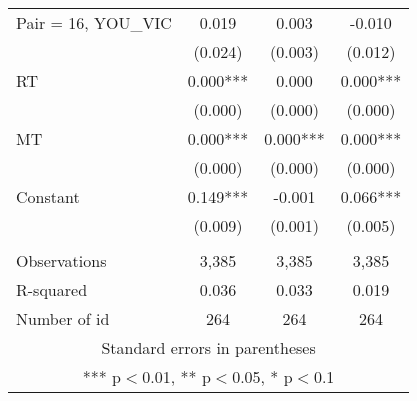 \documentclass[]{article}
\begin{document}
\begin{tabular}{lccc}
Pair = 16, YOU\_VIC & 0.019 & 0.003 & -0.010 \\
 & (0.024) & (0.003) & (0.012) \\
RT & 0.000*** & 0.000 & 0.000*** \\
 & (0.000) & (0.000) & (0.000) \\
MT & 0.000*** & 0.000*** & 0.000*** \\
 & (0.000) & (0.000) & (0.000) \\
Constant & 0.149*** & -0.001 & 0.066*** \\
 & (0.009) & (0.001) & (0.005) \\
 &  &  &  \\
Observations & 3,385 & 3,385 & 3,385 \\
R-squared & 0.036 & 0.033 & 0.019 \\
 Number of id & 264 & 264 & 264 \\ \hline
\multicolumn{4}{c}{ Standard errors in parentheses} \\
\multicolumn{4}{c}{ *** p$<$0.01, ** p$<$0.05, * p$<$0.1} \\
\end{tabular}
\end{document}
